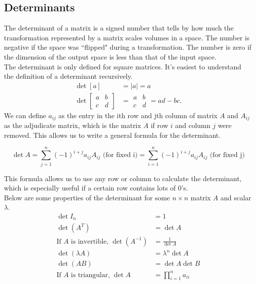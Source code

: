 \subsection{Determinants}
\noindent
The determinant of a matrix is a signed number that tells by how much the transformation represented by a matrix scales volumes in a space.
The number is negative if the space was ``flipped" during a transformation.
The number is zero if the dimension of the output space is less than that of the input space.\\

\noindent
The determinant is only defined for square matrices. It's easiest to understand the definition of a determinant recursively.
\begin{align*}
	\det{\left[ a \right]} &= \lvert a \rvert = a \\
	\det{\left[
		\begin{array}{cc}
			a & b \\
			c & d
		\end{array}
		\right]} &= \begin{array}{|cc|}
		a & b \\
		c & d
	\end{array} = ad - bc.
\end{align*}
We can define $a_{ij}$ as the entry in the ith row and jth column of matrix $A$ and $A_{ij}$ as the adjudicate matrix, which is the matrix $A$ if row $i$ and column $j$ were removed. This allows us to write a general formula for the determinant.
\begin{definition}
	\begin{equation*}
		\det{A} = \sum_{j=1}^{n}{\left(-1\right)^{i+j}a_{ij}A_{ij}} \text{ (for fixed i)} = \sum_{i=1}^{n}{\left(-1\right)^{i+j}a_{ij}A_{ij}} \text{ (for fixed j)}
	\end{equation*}
\end{definition}
\noindent
This formula allows us to use any row or column to calculate the determinant, which is especially useful if a certain row contains lots of 0's.\\

\noindent
Below are some properties of the determinant for some $n \times n$ matrix $A$ and scalar $\lambda$.
\begin{align*}
	\det{I_n} &= 1 \\
	\det{(A^T)} &= \det{A} \\
	\text{If $A$ is invertible, } \det{(A^{-1})} &= \frac{1}{\det{A}} \\
	\det{(\lambda A)} &= \lambda^n\det{A} \\
	\det{(AB)} &= \det{A}\det{B} \\
	\text{If $A$ is triangular, } \det{A} &= \prod_{i=1}^{n}{a_{ii}}
\end{align*}

